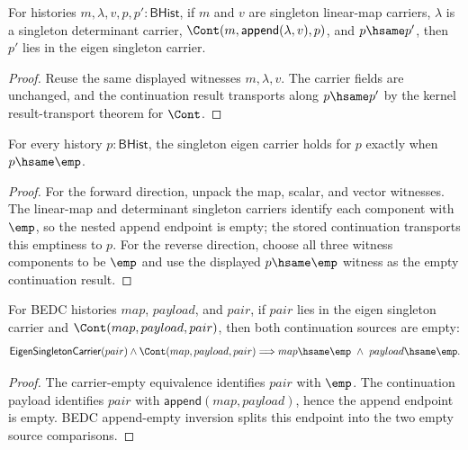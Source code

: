 \begin{theorem}
\label{thm:eigen-singleton-carrier-cont-result-transport}
For histories $m,\lambda,v,p,p':\mathsf{BHist}$, if $m$ and $v$ are singleton
linear-map carriers, $\lambda$ is a singleton determinant carrier,
$\Cont(m,\mathsf{append}(\lambda,v),p)$, and $p\hsame p'$, then $p'$ lies in
the eigen singleton carrier.
\end{theorem}
\begin{proof}
Reuse the same displayed witnesses $m,\lambda,v$. The carrier fields are
unchanged, and the continuation result transports along $p\hsame p'$ by the
kernel result-transport theorem for $\Cont$.
\end{proof}

\begin{theorem}
\label{thm:eigen-singleton-carrier-empty-iff}
For every history $p:\mathsf{BHist}$, the singleton eigen carrier holds for
$p$ exactly when $p\hsame\emp$.
\end{theorem}
\begin{proof}
For the forward direction, unpack the map, scalar, and vector witnesses. The
linear-map and determinant singleton carriers identify each component with
$\emp$, so the nested append endpoint is empty; the stored continuation
transports this emptiness to $p$. For the reverse direction, choose all three
witness components to be $\emp$ and use the displayed $p\hsame\emp$ witness
as the empty continuation result.
\end{proof}

\begin{theorem}
\label{thm:eigen-singleton-carrier-cont-sources-empty}
For BEDC histories $map$, $payload$, and $pair$, if $pair$ lies in the eigen
singleton carrier and $\Cont(map,payload,pair)$, then both continuation sources
are empty:
$$
\mathsf{EigenSingletonCarrier}(pair)\land \Cont(map,payload,pair)
\Longrightarrow map\hsame\emp\ \wedge\ payload\hsame\emp.
$$
\end{theorem}
\begin{proof}
The carrier-empty equivalence identifies $pair$ with $\emp$. The continuation
payload identifies $pair$ with $\mathsf{append}(map,payload)$, hence the
append endpoint is empty. BEDC append-empty inversion splits this endpoint into
the two empty source comparisons.
\end{proof}

